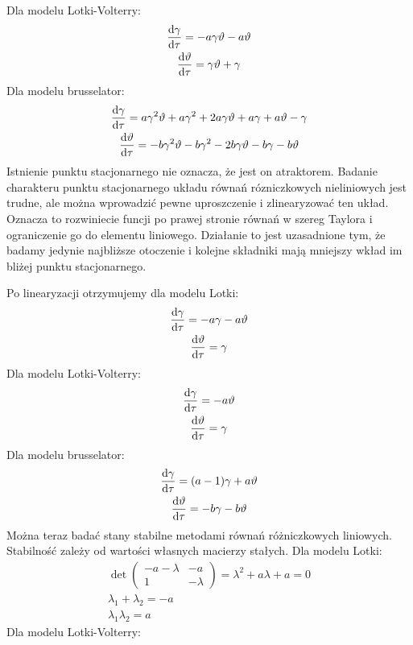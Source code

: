 \documentclass[10pt, a4paper, twoside, onecolumn]{article}
\numberwithin{equation}{section}
\begin{document}
	Dla modelu Lotki-Volterry:
	\begin{gather}
		\dv{\gamma}{\tau}=-a\gamma\vartheta-a\vartheta \\
		\dv{\vartheta}{\tau}=\gamma\vartheta+\gamma
	\end{gather}
	Dla modelu brusselator:
	\begin{gather}
		\dv{\gamma}{\tau}=a\gamma^{2}\vartheta+a\gamma^{2}+2a\gamma\vartheta+a\gamma+a\vartheta-\gamma \\
		\dv{\vartheta}{\tau}=-b\gamma^{2}\vartheta-b\gamma^{2}-2b\gamma\vartheta-b\gamma-b\vartheta
	\end{gather}
	Istnienie punktu stacjonarnego nie oznacza, że jest on atraktorem. Badanie charakteru punktu stacjonarnego układu równań rózniczkowych nieliniowych jest trudne, ale można wprowadzić pewne uproszczenie i zlinearyzować ten układ. Oznacza to rozwiniecie funcji po prawej stronie równań w szereg Taylora i ograniczenie go do elementu liniowego. Działanie to jest uzasadnione tym, że badamy jedynie najbliższe otoczenie i kolejne składniki mają mniejszy wkład im bliżej punktu stacjonarnego. \par
	Po linearyzacji otrzymujemy dla modelu Lotki:
	\begin{gather}
		\dv{\gamma}{\tau}=-a\gamma-a\vartheta \\
		\dv{\vartheta}{\tau}=\gamma
	\end{gather}
	Dla modelu Lotki-Volterry:
	\begin{gather}
		\dv{\gamma}{\tau}=-a\vartheta \\
		\dv{\vartheta}{\tau}=\gamma
	\end{gather}
	Dla modelu brusselator:
	\begin{gather}
		\dv{\gamma}{\tau}=(a-1)\gamma+a\vartheta \\
		\dv{\vartheta}{\tau}=-b\gamma-b\vartheta
	\end{gather}
	Można teraz badać stany stabilne metodami równań różniczkowych liniowych. Stabilność zależy od wartości własnych macierzy stałych. Dla modelu Lotki:
	\begin{gather}
		\det
		\begin{pmatrix}
			-a-\lambda & -a \\
			1 & -\lambda
		\end{pmatrix}
		=\lambda^{2}+a\lambda+a=0 \\
		\lambda_{1}+\lambda_{2}=-a \\
		\lambda_{1}\lambda_{2}=a
	\end{gather}
	Dla modelu Lotki-Volterry:
\end{document}
